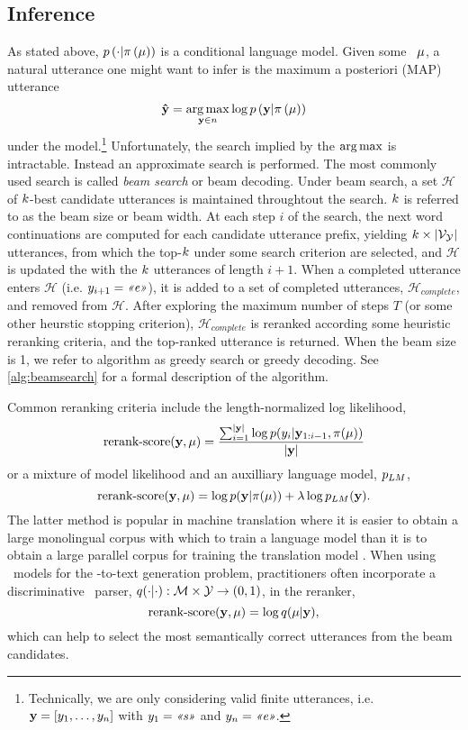 


\subsection{Inference}
\label{sec:nlginference}

As stated above, $p\left(\cdot|\pi\left(\mu\right)\right)$ is a conditional language model.
Given some \meaningrepresentation~$\mu$, a natural utterance one might want to infer is the 
maximum a posteriori (MAP)
 utterance \[\boldsymbol{\hat{\mathbf{y}}} = \operatorname*{arg\,max}_{\mathbf{y}\in n} \log p\left(\mathbf{y}|\pi\left(\mu\right)\right) \] under the model.\footnote{Technically, we are only considering valid finite utterances, i.e. $\mathbf{y} = \left[y_1,\ldots,y_n\right]$ with $y_1 = \textit{<<s>>}$ and $y_n = \textit{<<e>>}$. } Unfortunately, the search implied by the $\operatorname*{arg\,max}$
is intractable. Instead an approximate search is performed. The most commonly used search
is called \textit{beam search} \citep{reddy1977} or beam decoding. 
Under beam search, a set $\mathcal{H}$ 
of $k$-best
candidate utterances is maintained throughtout the search. $k$ is referred
to as the beam size or beam width. At each step $i$ of the search,
the next word continuations are computed for each candidate utterance prefix, yielding $k \times \lvert\mathcal{V}_{\mathcal{Y}}\rvert$ utterances,
from which the top-$k$ under some search criterion are selected, and $\mathcal{H}$ is updated the with
the $k$ utterances of length $i+1$. 
When a completed utterance enters $\mathcal{H}$ (i.e. $y_{i+1} = \textit{<<e>>}$), it is added to a set of
completed utterances, $\mathcal{H}_{complete}$, and removed from $\mathcal{H}$.
After exploring the maximum number of steps $T$ (or some other heurstic
stopping criterion), $\mathcal{H}_{complete}$ is reranked according some heuristic 
reranking criteria, and the top-ranked  utterance is returned.
When the beam size
is 1, we refer to algorithm as greedy search or greedy decoding.
See \autoref{alg:beamsearch} for a formal description of the algorithm.

Common reranking criteria include the length-normalized log likelihood,
\[ \operatorname{rerank-score}(\mathbf{y},\mu) = \frac{\sum_{i=1}^{\left\vert \mathbf{y} \right\vert} \log p(y_i|\mathbf{y}_{1:i-1},\pi(\mu))}{{\left\vert \mathbf{y} \right\vert}}\]
or a mixture of model likelihood and an auxilliary  language model, $p_{LM}$,
\[ \operatorname{rerank-score}(\mathbf{y},\mu) = \log p(\mathbf{y}|\pi(\mu)) + \lambda \log p_{LM}(\mathbf{y}).\]
The latter method is popular in machine translation where it is easier
to obtain a large monolingual corpus with which to train a language model
than it is to obtain a large parallel corpus for training the translation model \cite{xie2017neural}. When using \sequencetosequence~models for the 
\meaningrepresentation-to-text generation problem, practitioners often incorporate
a discriminative \meaningrepresentation~parser, $q(\cdot|\cdot) : \mathcal{M} \times \mathcal{Y} \rightarrow (0,1)$,
in the reranker,
\[ \operatorname{rerank-score}(\mathbf{y},\mu) = \log q(\mu|\mathbf{y}),\]
which can help to select the most semantically correct utterances from the beam
candidates.
 

